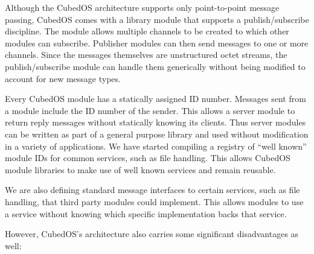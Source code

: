 Although the CubedOS architecture supports only point-to-point message passing, CubedOS comes
with a library module that supports a publish/subscribe discipline. The module allows multiple
channels to be created to which other modules can subscribe. Publisher modules can then send
messages to one or more channels. Since the messages themselves are unstructured octet streams,
the publish/subscribe module can handle them generically without being modified to account for
new message types.

Every CubedOS module has a statically assigned ID number. Messages sent from a module include
the ID number of the sender. This allows a server module to return reply messages without
statically knowing its clients. Thus server modules can be written as part of a general purpose
library and used without modification in a variety of applications. We have started compiling a
registry of ``well known'' module IDs for common services, such as file handling. This allows
CubedOS module libraries to make use of well known services and remain reusable.

We are also defining standard message interfaces to certain services, such as file handling,
that third party modules could implement. This allows modules to use a service without knowing
which specific implementation backs that service.

However, CubedOS's architecture also carries some significant disadvantages as well:


